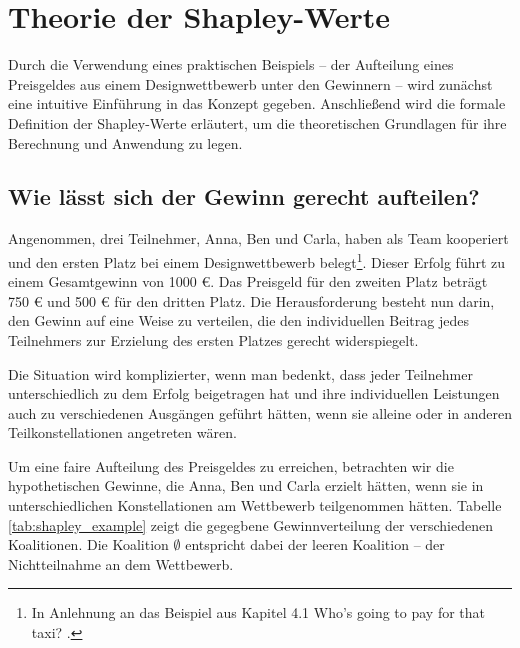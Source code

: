 \chapter{Theorie der Shapley-Werte}

Durch die Verwendung eines praktischen Beispiels – der Aufteilung 
eines Preisgeldes aus einem Designwettbewerb unter den Gewinnern – wird zunächst eine intuitive Einführung 
in das Konzept gegeben. Anschließend wird die formale Definition der Shapley-Werte erläutert, um die 
theoretischen Grundlagen für ihre Berechnung und Anwendung zu legen.

\section{Wie lässt sich der Gewinn gerecht aufteilen?}

Angenommen, drei Teilnehmer, Anna, Ben und Carla, haben als Team kooperiert und den ersten Platz bei einem Designwettbewerb belegt\footnote{In Anlehnung an das Beispiel aus Kapitel 4.1 \glqq{}Who's going to pay for that taxi?\grqq{} \cite[S.17-20]{Molnar_2023}.}. 
Dieser Erfolg führt zu einem Gesamtgewinn von 1000 \euro. Das Preisgeld für den zweiten Platz beträgt 750 \euro{} und 500 \euro{} für den dritten Platz.
Die Herausforderung besteht nun darin, den Gewinn auf eine Weise zu verteilen, die den individuellen Beitrag jedes Teilnehmers 
zur Erzielung des ersten Platzes gerecht widerspiegelt.

Die Situation wird komplizierter, wenn man bedenkt, dass jeder Teilnehmer unterschiedlich zu dem Erfolg 
beigetragen hat und ihre individuellen Leistungen auch zu verschiedenen Ausgängen geführt hätten, 
wenn sie alleine oder in anderen Teilkonstellationen angetreten wären.

Um eine faire Aufteilung des Preisgeldes zu erreichen, betrachten wir die hypothetischen Gewinne, 
die Anna, Ben und Carla erzielt hätten, wenn sie in unterschiedlichen Konstellationen am Wettbewerb teilgenommen hätten.
Tabelle \ref{tab:shapley_example} zeigt die gegegbene Gewinnverteilung der verschiedenen Koalitionen. Die Koalition $\emptyset$ entspricht
dabei der leeren Koalition -- der Nichtteilnahme an dem Wettbewerb.

